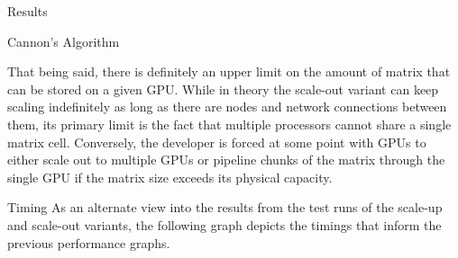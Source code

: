 \documentclass{article}
\begin{document}
\begin{section}{Results}
\begin{subsection}{Cannon's Algorithm}
\begin{paragraph}{}
    \end{paragraph}
    \begin{paragraph}{}
      That being said, there is definitely an upper limit on the amount of matrix that can be stored on a given GPU. While in theory the scale-out variant can
      keep scaling indefinitely as long as there are nodes and network connections between them, its primary limit is the fact that multiple processors
      cannot share a single matrix cell. Conversely, the developer is forced at some point with GPUs to either scale out to multiple GPUs or pipeline chunks
      of the matrix through the single GPU if the matrix size exceeds its physical capacity.
    \end{paragraph}
    \begin{paragraph}{Timing}
      As an alternate view into the results from the test runs of the scale-up and scale-out variants, the following graph depicts the timings
      that inform the previous performance graphs.
    \end{paragraph}
    \begin{paragraph}{}
\end{paragraph}
\end{subsection}
\end{section}
\end{document}
